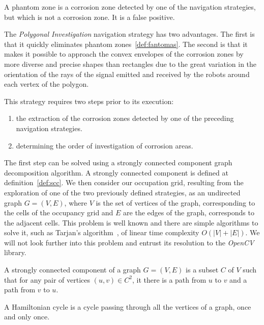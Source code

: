 \documentclass[english,RandD]{rapportPFE}  %
\begin{document}
				\begin{Definition}
					\label{def:fantomas}
					A phantom zone is a corrosion zone detected by one of the navigation strategies, but which is not a corrosion zone. It is a false positive.
				\end{Definition}

				The \textit{Polygonal Investigation} navigation strategy has two advantages.
				The first is that it quickly eliminates phantom zones~\ref{def:fantomas}.
				The second is that it makes it possible to approach the convex envelopes of the corrosion zones by more diverse and precise shapes than rectangles due to the great variation in the orientation of the rays of the signal emitted and received by the robots around each vertex of the polygon.

				This strategy requires two steps prior to its execution:
				\begin{enumerate}
					\item the extraction of the corrosion zones detected by one of the preceding navigation strategies.
					\item determining the order of investigation of corrosion areas.
				\end{enumerate}

				The first step can be solved using a strongly connected component graph decomposition algorithm.
				A strongly connected component is defined at definition~\ref{def:scc}.
				We then consider our occupation grid, resulting from the exploration of one of the two previously defined strategies, as an undirected graph $G = (V, E)$, where $V$ is the set of vertices of the graph, corresponding to the cells of the occupancy grid and $E$ are the edges of the graph, corresponds to the adjacent cells.
				This problem is well known and there are simple algorithms to solve it, such as Tarjan's algorithm~\cite{enwiki:1148118528}, of linear time complexity $O(|V| + |E|)$.
				We will not look further into this problem and entrust its resolution to the \textit{OpenCV} library.

				\begin{Definition}
					\label{def:scc}
					A strongly connected component of a graph $G = (V, E)$ is a subset $C$ of $V$ such that for any pair of vertices $(u, v) \in C^2$, it there is a path from $u$ to $v$ and a path from $v$ to $u$.
				\end{Definition}

				\begin{Definition}
					\label{def:hamilton}
					A Hamiltonian cycle is a cycle passing through all the vertices of a graph, once and only once.
				\end{Definition}
\end{document}
